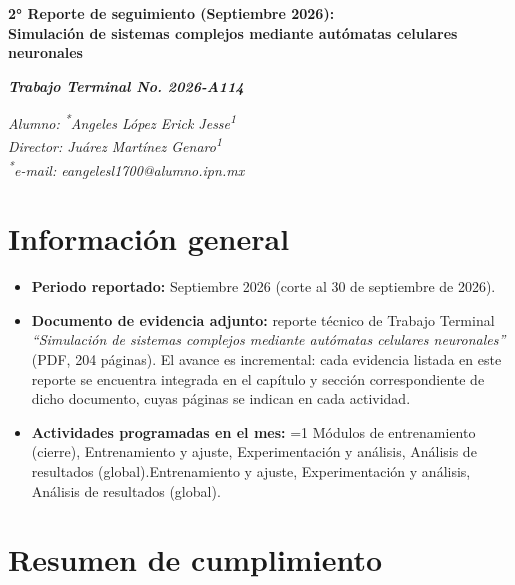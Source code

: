 \documentclass[letterpaper,10pt,oneside]{article}
\newcommand\authormark[1]{\textsuperscript{#1}}
\providecommand\corte{2}
\def\numReporte{1}
\def\mes{Agosto}
\def\fechaCorte{31 de agosto de 2026}
\def\numReporte{2}
\def\mes{Septiembre}
\def\fechaCorte{30 de septiembre de 2026}
\newcommand\segun[2]{\ifnum\corte=1 #1\else #2\fi}
\begin{document}
	\begin{center}
		\fontsize{14}{16}\selectfont\bfseries
		\numReporte° Reporte de seguimiento (\mes{} 2026): \\
		Simulación de sistemas complejos mediante autómatas celulares neuronales
	\end{center}

	\begin{center}
		\fontsize{14}{16}\selectfont\bfseries
		\textit{Trabajo Terminal No. 2026-A114}
	\end{center}

	\begin{center}
		\fontsize{12}{16}\selectfont
		\textit{Alumno: \authormark{*}Angeles López Erick Jesse\authormark{1}} \\
		\textit{Director: Juárez Martínez Genaro\authormark{1}} \\
		\textit{\authormark{*}e-mail: eangelesl1700@alumno.ipn.mx}
	\end{center}

	\section{Información general}

	\begin{itemize}[leftmargin=*]
		\item \textbf{Periodo reportado:} \mes{} 2026 (corte al \fechaCorte).
		\item \textbf{Documento de evidencia adjunto:} reporte técnico de Trabajo Terminal
		\textit{``Simulación de sistemas complejos mediante autómatas celulares neuronales''} (PDF, 204 páginas).
		El avance es incremental: cada evidencia listada en este reporte se encuentra integrada en el capítulo
		y sección correspondiente de dicho documento, cuyas páginas se indican en cada actividad.
		\item \textbf{Actividades programadas en el mes:} \segun{Módulos de entrenamiento (cierre), Entrenamiento y ajuste,
		Experimentación y análisis, Análisis de resultados (global).}{Entrenamiento y ajuste, Experimentación y análisis,
		Análisis de resultados (global).}
	\end{itemize}

	\section{Resumen de cumplimiento}
\end{document}
